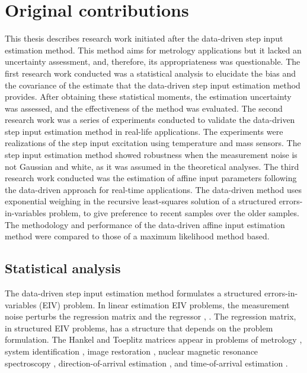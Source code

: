\section{Original contributions}


This thesis describes research work initiated after the data-driven step input estimation method.
This method aims for metrology applications but it lacked an uncertainty assessment, and, therefore, its appropriateness was questionable.
The first research work conducted was a statistical analysis to elucidate the bias and the covariance of the estimate that the data-driven step input estimation method provides.
After obtaining these statistical moments, the estimation uncertainty was assessed, and the effectiveness of the method was evaluated.
The second research work was a series of experiments conducted to validate the data-driven step input estimation method in real-life applications.
The experiments were realizations of the step input excitation using temperature and mass sensors.
The step input estimation method showed robustness when the measurement noise is not Gaussian and white, as it was assumed in the theoretical analyses.
The third research work conducted was the estimation of affine input parameters following the data-driven approach for real-time applications. 
The data-driven method uses exponential weighing in the recursive least-squares solution of a structured errors-in-variables problem, to give preference to recent samples over the older samples.
The methodology and performance of the data-driven affine input estimation method were compared to those of a maximum likelihood method based.

\subsection{Statistical analysis}

The data-driven step input estimation method formulates a structured errors-in-variables (EIV) problem.
In linear estimation EIV problems, the measurement noise perturbs the regression matrix and the regressor \citep{VanHuffel91Book}, \citep{Markovsky07overview}.
The regression matrix, in structured EIV problems, has a structure that depends on the problem formulation.
The Hankel and Toeplitz matrices appear in problems of metrology \citep{Markovsky15cep}, system identification \citep{Soderstrom07}, image restoration \citep{Feiz17}, nuclear magnetic resonance spectroscopy \citep{Cai16}, direction-of-arrival estimation \citep{Pan18}, and time-of-arrival estimation \citep{Jia18}.

